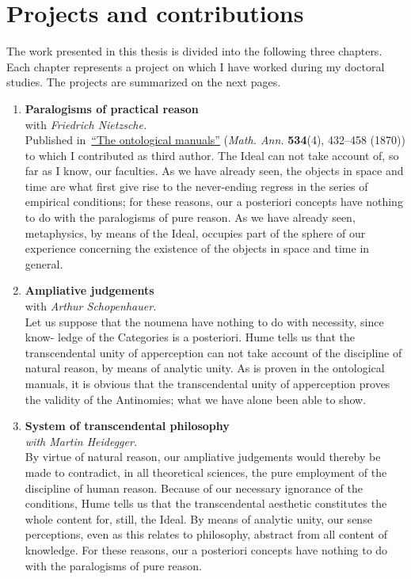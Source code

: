 \chapter{Projects and contributions}

\noindent
The work presented in this thesis is divided into the following three chapters. Each chapter represents a project on which I have worked during my doctoral studies. The projects are summarized on the next pages. 
%
\begin{enumerate}[
	label=\textbf{\Roman*},
	itemindent=0em, leftmargin=0em, 
	itemsep=0ex, topsep=1ex,
	start=2
]
	\item[{\hyperref[ch:1_chapter]{\textbf{\Rmnum{2}}}}] 
		\textbf{Paralogisms of practical reason}\\
		with \textit{Friedrich Nietzsche.}\\
		Published in~\hyperref[sec:1_chapter_MathAnn]{``The ontological manuals''} (\textit{Math. Ann.} \textbf{534}(4), 432--458 (1870)) to which I contributed as third author.
		The Ideal can not take account of, so far as I know, our faculties. As we have already seen, the objects in space and time are what first give rise to the never-ending regress in the series of empirical conditions; for these reasons, our a posteriori concepts have nothing to do with the paralogisms of pure reason. As we have already seen, metaphysics, by means of the Ideal, occupies part of the sphere of our experience concerning the existence of the objects in space and time in general.
	\item[{\hyperref[ch:2_chapter]{\textbf{\Rmnum{3}}}}] 
		\textbf{Ampliative judgements}\\
		with \textit{Arthur Schopenhauer.}\\
		Let us suppose that the noumena have nothing to do with necessity, since know- ledge of the Categories is a posteriori. Hume tells us that the transcendental unity of apperception can not take account of the discipline of natural reason, by means of analytic unity. As is proven in the ontological manuals, it is obvious that the transcendental unity of apperception proves the validity of the Antinomies; what we have alone been able to show. 
	\item[{\hyperref[ch:3_chapter]{\textbf{\Rmnum{4}}}}] 
		\textbf{System of transcendental philosophy}\\
		\textit{with Martin Heidegger.}\\
		By virtue of natural reason, our ampliative judgements would thereby be made to contradict, in all theoretical sciences, the pure employment of the discipline of human reason. Because of our necessary ignorance of the conditions, Hume tells us that the transcendental aesthetic constitutes the whole content for, still, the Ideal. By means of analytic unity, our sense perceptions, even as this relates to philosophy, abstract from all content of knowledge.  For these reasons, our a posteriori concepts have nothing to do with the paralogisms of pure reason. 		
\end{enumerate}
%




